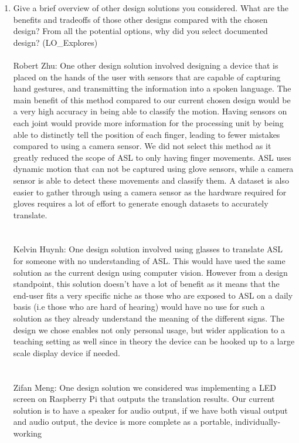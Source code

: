 \documentclass[12pt, titlepage]{article}
\begin{document}
\begin{enumerate}
  \item Give a brief overview of other design solutions you considered.  What
  are the benefits and tradeoffs of those other designs compared with the chosen
  design?  From all the potential options, why did you select documented design?
  (LO\_Explores)
  ~\\
  \\
  Robert Zhu: One other design solution involved designing a device that is placed on the hands of the user with sensors that are capable of capturing 
  hand gestures, and transmitting the information into a spoken language. The main benefit of this method compared to our current chosen design would 
  be a very high accuracy in being able to classify the motion. Having sensors on each joint would provide more information for the processing unit by 
  being able to distinctly tell the position of each finger, leading to fewer mistakes compared to using a camera sensor. We did not select this method 
  as it greatly reduced the scope of ASL to only having finger movements. ASL uses dynamic motion that can not be captured using glove sensors, while a 
  camera sensor is able to detect these movements and classify them. A dataset is also easier to gather through using a camera sensor as the hardware 
  required for gloves requires a lot of effort to generate enough datasets to accurately translate.
  \\
  ~\\
  \\
  Kelvin Huynh: One design solution involved using glasses to translate ASL for someone with no understanding of ASL. This would have used the same solution 
  as the current design using computer vision. However from a design standpoint, this solution doesn’t have a lot of benefit as it means that the end-user 
  fits a very specific niche as those who are exposed to ASL on a daily basis (i.e those who are hard of hearing) would have no use for such a solution as they 
  already understand the meaning of the different signs. The design we chose enables not only personal usage, but wider application to a teaching setting as 
  well since in theory the device can be hooked up to a large scale display device if needed.
  \\
  ~\\
  \\
  Zifan Meng: One design solution we considered was implementing a LED screen on Raspberry Pi that outputs the translation results. Our current solution 
  is to have a speaker for audio output, if we have both visual output and audio output, the device is more complete as a portable, individually-working 

\end{enumerate}
\end{document}
